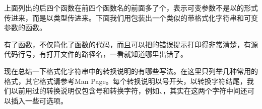 上面列出的后四个函数在前四个函数名的前面多了个，表示可变参数不是以的形式传进来，而是以类型传进来。下面我们用包装出一个类似的带格式化字符串和可变参数的函数。





有了函数，不仅简化了函数的代码，而且可以把的错误提示打印得非常清楚，有源代码行号，有打开文件的路径名，一看就知道哪里出错了。



现在总结一下格式化字符串中的转换说明的有哪些写法。在这里只列举几种常用的格式，其它格式请参考Man Page。每个转换说明以\BookCode{\%}号开头，以转换字符结尾，我们以前用过的转换说明仅包含\BookCode{\%}号和转换字符，例如、，其实在这两个字符中间还可以插入一些可选项。



